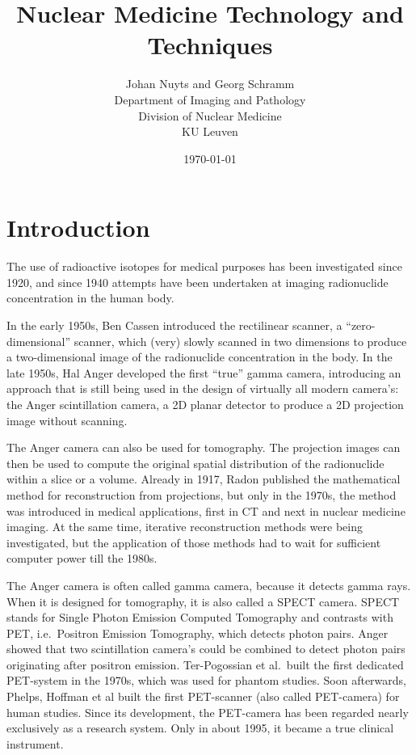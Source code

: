 \documentclass[11pt,oneside]{book}
\title{Nuclear Medicine Technology and Techniques}
\author{Johan Nuyts and Georg Schramm\\[3mm]
        Department of Imaging and Pathology \\
        Division of Nuclear Medicine \\
        KU Leuven}
\date{\today}
\begin{document}
           
\maketitle

\tableofcontents

\chapter{Introduction}

The use of radioactive isotopes for medical purposes has been investigated
since 1920, and since 1940 attempts have been undertaken at imaging
radionuclide concentration in the human body.

In the early 1950s, Ben Cassen introduced the rectilinear scanner, a
``zero-dimensional'' scanner, which (very) slowly scanned in two
dimensions to produce a two-dimensional image of the radionuclide
concentration in the body. In the late 1950s, Hal Anger developed the
first ``true'' gamma camera, introducing an approach that is still
being used in the design of virtually all modern camera's: the Anger
scintillation camera, a 2D planar detector to produce a 2D projection
image without scanning.

The Anger camera can also be used for tomography. The projection images can
then be used to compute the original spatial distribution of the radionuclide
within a slice or a volume. Already in 1917, Radon published the mathematical
method for reconstruction from projections, but only in the 1970s, the method
was introduced in medical applications, first in CT and next in nuclear
medicine imaging. At the same time, iterative reconstruction methods were
being investigated, but the application of those methods had to wait for
sufficient computer power till the 1980s.

The Anger camera is often called gamma camera, because it detects gamma rays.
When it is designed for tomography, it is also called a SPECT camera. SPECT
stands for Single Photon Emission Computed Tomography and contrasts with PET,
i.e.\ Positron Emission Tomography, which detects photon pairs. Anger showed
that two scintillation camera's could be combined to detect photon pairs
originating after positron emission. Ter-Pogossian et al.\ built the first
dedicated PET-system in the 1970s, which was used for phantom studies.  Soon
afterwards, Phelps, Hoffman et al built the first PET-scanner (also called
PET-camera) for human studies. Since its development,
the PET-camera has been regarded nearly exclusively as a research system.
Only in about 1995, it became a true clinical instrument.
\end{document}
